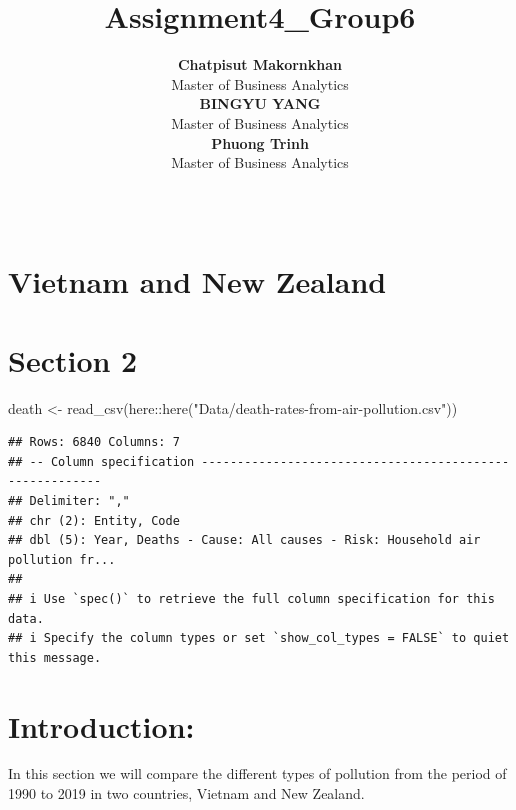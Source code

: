 \documentclass[11pt,a4paper,]{article}
\title{Assignment4\_Group6}
\author{\sf\Large\textbf{ Chatpisut Makornkhan}\\ {\sf\large Master of Business Analytics\\[0.5cm]} \sf\Large\textbf{ BINGYU YANG}\\ {\sf\large Master of Business Analytics\\[0.5cm]} \sf\Large\textbf{ Phuong Trinh}\\ {\sf\large Master of Business Analytics\\[0.5cm]}}
\date{\sf\Date~\Month~\Year}
\makeatletter
\newenvironment{Shaded}{\begin{snugshade}}{\end{snugshade}}
\newcommand{\FunctionTok}[1]{\textcolor[rgb]{0.00,0.00,0.00}{#1}}
\newcommand{\NormalTok}[1]{#1}
\newcommand{\OtherTok}[1]{\textcolor[rgb]{0.56,0.35,0.01}{#1}}
\newcommand{\SpecialCharTok}[1]{\textcolor[rgb]{0.00,0.00,0.00}{#1}}
\newcommand{\StringTok}[1]{\textcolor[rgb]{0.31,0.60,0.02}{#1}}
\def\titlepage{\front{\expandafter{\@title}}{\@author}{\@organization}}
\makeatother
\begin{document}
\titlepage

{
\setcounter{tocdepth}{2}
\tableofcontents
}
\section*{Vietnam and New Zealand}

\hypertarget{section-2}{%
\section{Section 2}\label{section-2}}

\begin{Shaded}
\begin{Highlighting}[]
\NormalTok{death }\OtherTok{\textless{}{-}} \FunctionTok{read\_csv}\NormalTok{(here}\SpecialCharTok{::}\FunctionTok{here}\NormalTok{(}\StringTok{"Data/death{-}rates{-}from{-}air{-}pollution.csv"}\NormalTok{))}
\end{Highlighting}
\end{Shaded}

\begin{verbatim}
## Rows: 6840 Columns: 7
## -- Column specification --------------------------------------------------------
## Delimiter: ","
## chr (2): Entity, Code
## dbl (5): Year, Deaths - Cause: All causes - Risk: Household air pollution fr...
## 
## i Use `spec()` to retrieve the full column specification for this data.
## i Specify the column types or set `show_col_types = FALSE` to quiet this message.
\end{verbatim}

\hypertarget{introduction}{%
\section{Introduction:}\label{introduction}}

In this section we will compare the different types of pollution from the period of 1990 to 2019 in two countries, Vietnam and New Zealand.
\end{document}
